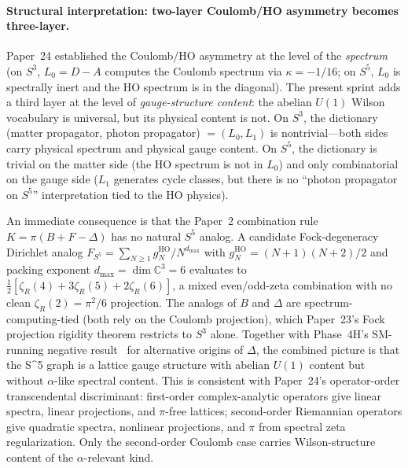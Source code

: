 \documentclass[aps,pra,twocolumn,superscriptaddress,longbibliography]{revtex4-2}
\begin{document}
\paragraph*{Structural interpretation: two-layer Coulomb/HO
asymmetry becomes three-layer.} Paper~24 established the
Coulomb/HO asymmetry at the level of the \emph{spectrum} (on
$S^3$, $L_0 = D - A$ computes the Coulomb spectrum via
$\kappa = -1/16$; on $S^5$, $L_0$ is spectrally inert and the HO
spectrum is in the diagonal).  The present sprint adds a third
layer at the level of \emph{gauge-structure content}: the abelian
$U(1)$ Wilson vocabulary is universal, but its physical content is
not.  On $S^3$, the dictionary (matter propagator, photon
propagator) $= (L_0, L_1)$ is nontrivial---both sides carry
physical spectrum and physical gauge content.  On $S^5$, the
dictionary is trivial on the matter side (the HO spectrum is not
in $L_0$) and only combinatorial on the gauge side ($L_1$
generates cycle classes, but there is no ``photon propagator on
$S^5$'' interpretation tied to the HO physics).

An immediate consequence is that the Paper~2 combination rule
$K = \pi(B + F - \Delta)$ has no natural $S^5$ analog.  A candidate
Fock-degeneracy Dirichlet analog $F_{S^5} = \sum_{N \geq 1}
g_N^{\text{HO}} / N^{d_{\max}}$ with
$g_N^{\text{HO}} = (N+1)(N+2)/2$ and packing exponent
$d_{\max} = \dim \mathbb{C}^3 = 6$ evaluates to
$\tfrac{1}{2}[\zeta_R(4) + 3\zeta_R(5) + 2\zeta_R(6)]$, a mixed
even/odd-zeta combination with no clean $\zeta_R(2) = \pi^2/6$
projection.  The analogs of $B$ and $\Delta$ are
spectrum-computing-tied (both rely on the Coulomb projection),
which Paper~23's Fock projection rigidity theorem restricts to
$S^3$ alone.  Together with Phase~4H's SM-running negative
result~\cite{Paper2} for alternative origins of $\Delta$, the
combined picture is that the S^5 graph is a lattice gauge
structure with abelian $U(1)$ content but without $\alpha$-like
spectral content.  This is consistent with Paper~24's operator-order
transcendental discriminant: first-order complex-analytic
operators give linear spectra, linear projections, and $\pi$-free
lattices; second-order Riemannian operators give quadratic
spectra, nonlinear projections, and $\pi$ from spectral zeta
regularization.  Only the second-order Coulomb case carries
Wilson-structure content of the $\alpha$-relevant kind.
\end{document}
